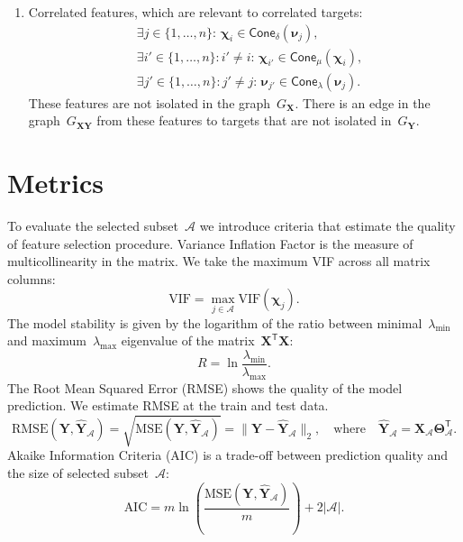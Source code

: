 \documentclass[12pt,twoside]{article}
\theoremstyle{definition}
\newcommand{\bY}{\mathbf{Y}}
\newcommand{\bX}{\mathbf{X}}
\newcommand{\cA}{\mathcal{A}}
\newcommand{\T}{\mathsf{T}}
\newcommand{\bchi}{\boldsymbol{\chi}}
\newcommand{\bnu}{\boldsymbol{\nu}}
\newcommand{\bTheta}{\boldsymbol{\Theta}}
\begin{document}
\begin{enumerate}
	\item Correlated features, which are relevant to correlated targets:
	\begin{align*}
	&\exists j \in \{1, \dots, n\}: \, \bchi_i \in \textsf{Cone}_{\delta} (\bnu_j), \\
	&\exists i' \in \{1, \dots, n\}: i' \neq i: \,\bchi_{i'} \in \textsf{Cone}_{\mu} (\bchi_i),  \\
	&\exists j' \in \{1, \dots, n\}: j' \neq j: \,\bnu_{j'} \in \textsf{Cone}_{\lambda} (\bnu_j).
	\end{align*}
	These features are not isolated in the graph~$G_{\bX}$. There is an edge in the graph~$G_{\bX\bY}$ from these features to targets that are not isolated in~$G_{\bY}$.
\end{enumerate}

\section{Metrics}

To evaluate the selected subset~$\cA$ we introduce criteria that estimate the quality of feature selection procedure.
Variance Inflation Factor is the measure of multicollinearity in the matrix. We take the maximum VIF across all matrix columns:
\[
	\text{VIF} = \max_{j \in \cA} \text{VIF} (\bchi_j).
\]
The model stability is given by the logarithm of the ratio between minimal~$\lambda_{\min}$ and maximum~$\lambda_{\max}$ eigenvalue of the matrix~$\bX^{\T} \bX$:
\[
	R = \ln \frac{\lambda_{\min}}{\lambda_{\max}}.
\]
The Root Mean Squared Error (RMSE) shows the quality of the model prediction. We estimate RMSE at the train and test data.
\[
	\text{RMSE}(\bY, \widehat{\bY}_{\cA}) = \sqrt{\text{MSE} (\bY, \widehat{\bY}_{\cA})} =  \| \bY - \widehat{\bY}_{\cA} \|_2, \quad \text{where} \quad \widehat{\bY}_{\cA} = \bX_{\cA} \bTheta_{\cA}^{\T}.
\]
Akaike Information Criteria (AIC) is a trade-off between prediction quality and the size of selected subset~$\cA$:
\[
	\text{AIC} = m \ln \left( \frac{\text{MSE} ( \bY, \widehat{\bY}_{\cA})}{m}\right) + 2 | \cA |.
\]

\end{document}
